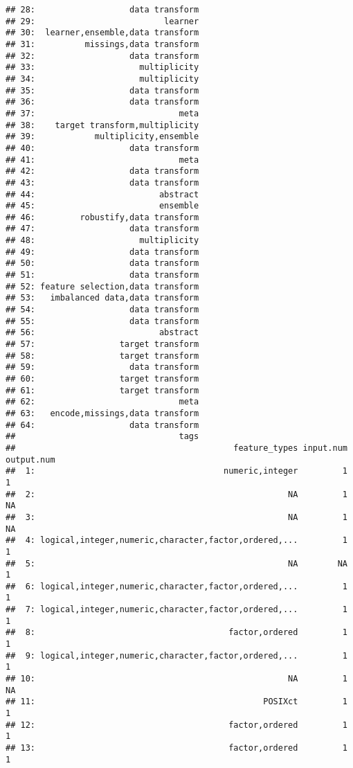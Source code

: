 \documentclass[
]{scrbook}
\begin{document}
\begin{verbatim}
## 28:                   data transform
## 29:                          learner
## 30:  learner,ensemble,data transform
## 31:          missings,data transform
## 32:                   data transform
## 33:                     multiplicity
## 34:                     multiplicity
## 35:                   data transform
## 36:                   data transform
## 37:                             meta
## 38:    target transform,multiplicity
## 39:            multiplicity,ensemble
## 40:                   data transform
## 41:                             meta
## 42:                   data transform
## 43:                   data transform
## 44:                         abstract
## 45:                         ensemble
## 46:         robustify,data transform
## 47:                   data transform
## 48:                     multiplicity
## 49:                   data transform
## 50:                   data transform
## 51:                   data transform
## 52: feature selection,data transform
## 53:   imbalanced data,data transform
## 54:                   data transform
## 55:                   data transform
## 56:                         abstract
## 57:                 target transform
## 58:                 target transform
## 59:                   data transform
## 60:                 target transform
## 61:                 target transform
## 62:                             meta
## 63:   encode,missings,data transform
## 64:                   data transform
##                                 tags
##                                            feature_types input.num output.num
##  1:                                      numeric,integer         1          1
##  2:                                                   NA         1         NA
##  3:                                                   NA         1         NA
##  4: logical,integer,numeric,character,factor,ordered,...         1          1
##  5:                                                   NA        NA          1
##  6: logical,integer,numeric,character,factor,ordered,...         1          1
##  7: logical,integer,numeric,character,factor,ordered,...         1          1
##  8:                                       factor,ordered         1          1
##  9: logical,integer,numeric,character,factor,ordered,...         1          1
## 10:                                                   NA         1         NA
## 11:                                              POSIXct         1          1
## 12:                                       factor,ordered         1          1
## 13:                                       factor,ordered         1          1

\end{verbatim}
\end{document}
